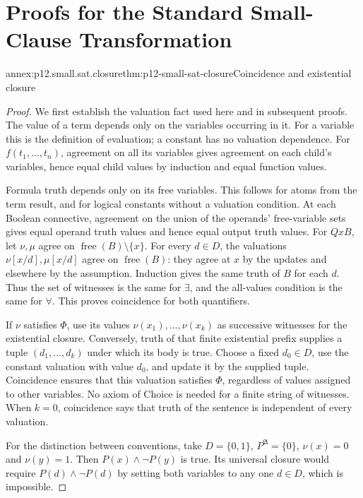 \chapter{Proofs for the Standard Small-Clause Transformation}
\label{annex:p12-small-clause-standard}

\begin{annexitem}{annex:p12.small.sat.closure}{thm:p12-small-sat-closure}{Coincidence and existential closure}
\begin{proof}
We first establish the valuation fact used here and in subsequent proofs.
The value of a term depends only on the variables occurring in it.
For a variable this is the definition of evaluation; a constant has no
valuation dependence. For \(f(t_1,\ldots,t_n)\), agreement on all its
variables gives agreement on each child's variables, hence equal child
values by induction and equal function values.

Formula truth depends only on its free variables. This follows for
atoms from the term result, and for logical constants without a
valuation condition. At each Boolean connective, agreement on the
union of the operands' free-variable sets gives equal operand truth
values and hence equal output truth values. For \(Qx B\), let
\(\nu,\mu\) agree on \(\operatorname{free}(B)\setminus\{x\}\).
For every \(d\in D\), the valuations \(\nu[x/d],\mu[x/d]\)
agree on \(\operatorname{free}(B)\): they agree at \(x\) by the
updates and elsewhere by the assumption. Induction gives the same
truth of \(B\) for each \(d\). Thus the set of witnesses is the
same for \(\exists\), and the all-values condition is the same for
\(\forall\). This proves coincidence for both quantifiers.

If \(\nu\) satisfies \(\Phi\), use its values
\(\nu(x_1),\ldots,\nu(x_k)\) as successive witnesses for the
existential closure. Conversely, truth of that finite existential
prefix supplies a tuple \((d_1,\ldots,d_k)\) under which its body
is true. Choose a fixed \(d_0\in D\), use the constant valuation
with value \(d_0\), and update it by the supplied tuple. Coincidence
ensures that this valuation satisfies \(\Phi\), regardless of
values assigned to other variables. No axiom of Choice is needed
for a finite string of witnesses. When \(k=0\), coincidence says
that truth of the sentence is independent of every valuation.

For the distinction between conventions, take \(D=\{0,1\}\),
\(P^{\mathfrak A}=\{0\}\), \(\nu(x)=0\) and \(\nu(y)=1\).
Then \(P(x)\land\neg P(y)\) is true. Its universal closure would
require \(P(d)\land\neg P(d)\) by setting both variables to any
one \(d\in D\), which is impossible.
\end{proof}
\end{annexitem}

